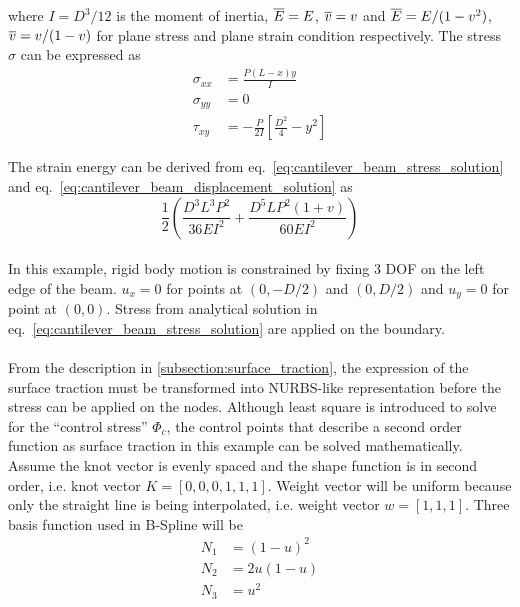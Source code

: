 where $I=D^3/12$ is the moment of inertia, $\overline{E}=E$, $\overline{v}=v$ and $\overline{E}=E/(1-v^2)$, $\overline{v}=v/(1-v)$ for plane
    stress and plane strain condition respectively.
The stress $\sigma$ can be expressed as \cite{Aug2008}
    \begin{subequations}
    \begin{align}
        \sigma_{xx} &= \frac{P(L-x)y}{I} \\
        \sigma_{yy} &= 0 \\
        \tau_{xy} &= -\frac{P}{2I} \left[
            \frac{D^2}{4} - y^2
        \right]
    \end{align}
    \label{eq:cantilever_beam_stress_solution}
    \end{subequations}

The strain energy can be derived from eq.~\ref{eq:cantilever_beam_stress_solution} and eq.~\ref{eq:cantilever_beam_displacement_solution} as
    \begin{equation}
        \frac{1}{2} \left(
            \frac{D^3 L^3 P^2}{36EI^2} + 
            \frac{D^5LP^2(1+v)}{60EI^2}
        \right)
    \label{eq:cantilever_beam_energy_solution}
    \end{equation}

\paragraph{}
In this example, rigid body motion is constrained by fixing 3 DOF on the left edge of the beam.
$u_x=0$ for points at $(0,-D/2)$ and $(0,D/2)$ and $u_y =0$ for point at $(0,0)$.
Stress from analytical solution in eq.~\ref{eq:cantilever_beam_stress_solution} are applied on the boundary.

\paragraph{}
From the description in \ref{subsection:surface_traction}, the expression of the surface traction must be transformed into
    NURBS-like representation before the stress can be applied on the nodes.
Although least square is introduced to solve for the ``control stress'' $\Phi_c$, the control points that describe a second
    order function as surface traction in this example can be solved mathematically.
Assume the knot vector is evenly spaced and the shape function is in second order, i.e. knot vector $K=[0,0,0,1,1,1]$.
Weight vector will be uniform because only the straight line is being interpolated, i.e. weight vector $w=[1,1,1]$.
Three basis function used in B-Spline will be
    \begin{equation}
    \begin{aligned}
        N_1 & = (1-u)^2 \\
        N_2 & = 2u(1-u) \\
        N_3 & = u^2
    \end{aligned}
    \end{equation}

